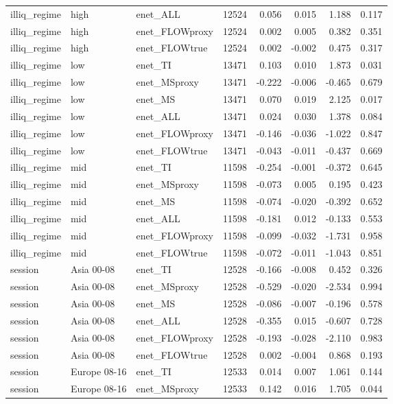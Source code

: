 \begin{tabular}{lllrrrrr}
illiq_regime & high & enet_ALL & 12524 & 0.056 & 0.015 & 1.188 & 0.117 \\
illiq_regime & high & enet_FLOWproxy & 12524 & 0.002 & 0.005 & 0.382 & 0.351 \\
illiq_regime & high & enet_FLOWtrue & 12524 & 0.002 & -0.002 & 0.475 & 0.317 \\
illiq_regime & low & enet_TI & 13471 & 0.103 & 0.010 & 1.873 & 0.031 \\
illiq_regime & low & enet_MSproxy & 13471 & -0.222 & -0.006 & -0.465 & 0.679 \\
illiq_regime & low & enet_MS & 13471 & 0.070 & 0.019 & 2.125 & 0.017 \\
illiq_regime & low & enet_ALL & 13471 & 0.024 & 0.030 & 1.378 & 0.084 \\
illiq_regime & low & enet_FLOWproxy & 13471 & -0.146 & -0.036 & -1.022 & 0.847 \\
illiq_regime & low & enet_FLOWtrue & 13471 & -0.043 & -0.011 & -0.437 & 0.669 \\
illiq_regime & mid & enet_TI & 11598 & -0.254 & -0.001 & -0.372 & 0.645 \\
illiq_regime & mid & enet_MSproxy & 11598 & -0.073 & 0.005 & 0.195 & 0.423 \\
illiq_regime & mid & enet_MS & 11598 & -0.074 & -0.020 & -0.392 & 0.652 \\
illiq_regime & mid & enet_ALL & 11598 & -0.181 & 0.012 & -0.133 & 0.553 \\
illiq_regime & mid & enet_FLOWproxy & 11598 & -0.099 & -0.032 & -1.731 & 0.958 \\
illiq_regime & mid & enet_FLOWtrue & 11598 & -0.072 & -0.011 & -1.043 & 0.851 \\
session & Asia 00-08 & enet_TI & 12528 & -0.166 & -0.008 & 0.452 & 0.326 \\
session & Asia 00-08 & enet_MSproxy & 12528 & -0.529 & -0.020 & -2.534 & 0.994 \\
session & Asia 00-08 & enet_MS & 12528 & -0.086 & -0.007 & -0.196 & 0.578 \\
session & Asia 00-08 & enet_ALL & 12528 & -0.355 & 0.015 & -0.607 & 0.728 \\
session & Asia 00-08 & enet_FLOWproxy & 12528 & -0.193 & -0.028 & -2.110 & 0.983 \\
session & Asia 00-08 & enet_FLOWtrue & 12528 & 0.002 & -0.004 & 0.868 & 0.193 \\
session & Europe 08-16 & enet_TI & 12533 & 0.014 & 0.007 & 1.061 & 0.144 \\
session & Europe 08-16 & enet_MSproxy & 12533 & 0.142 & 0.016 & 1.705 & 0.044 \\

\end{tabular}
